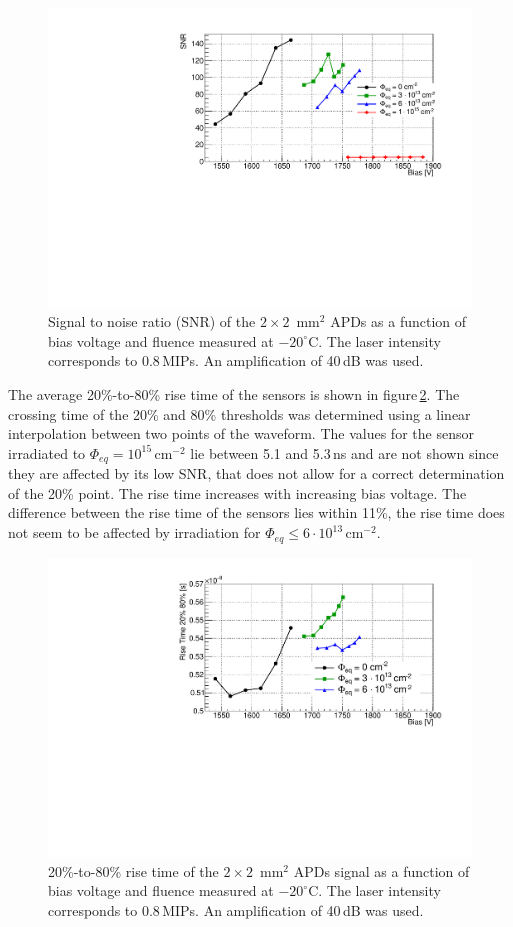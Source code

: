 \documentclass[review,number,sort&compress]{elsarticle}
\begin{document}
\begin{figure}
  \centering
  \includegraphics[width = 0.6 \columnwidth]{snr2x2APDs}
  \caption{Signal to noise ratio (SNR) of the $2 \times 2$~mm$^2$ APDs as a function of bias voltage and fluence measured at $-20^\circ$C. The laser intensity corresponds to 0.8\,MIPs. An amplification of 40\,dB was used.}
  \label{fig:snr2x2}
\end{figure}

The average 20\%-to-80\% rise time of the sensors is shown in figure\,\ref{fig:riseTime2x2}.
The crossing time of the 20\% and 80\% thresholds was determined using a linear interpolation between two points of the waveform.
The values for the sensor irradiated to $\Phi_{eq} = 10^{15}$\,cm$^{-2}$ lie between 5.1 and 5.3\,ns and are not shown since they are affected by its low SNR, that does not allow for a correct determination of the 20\% point.
The rise time increases with increasing bias voltage.
The difference between the rise time of the sensors lies within 11\%, the rise time does not seem to be affected by irradiation for $\Phi_{eq} \leq 6 \cdot 10^{13}$\,cm$^{-2}$.

\begin{figure}
  \centering
  \includegraphics[width = 0.6 \columnwidth]{riseTime2x2APDsNo1e15}
  \caption{20\%-to-80\% rise time of the $2 \times 2$~mm$^2$ APDs signal as a function of bias voltage and fluence measured at $-20^\circ$C. The laser intensity corresponds to 0.8\,MIPs. An amplification of 40\,dB was used.}
  \label{fig:riseTime2x2}
\end{figure}
\end{document}
